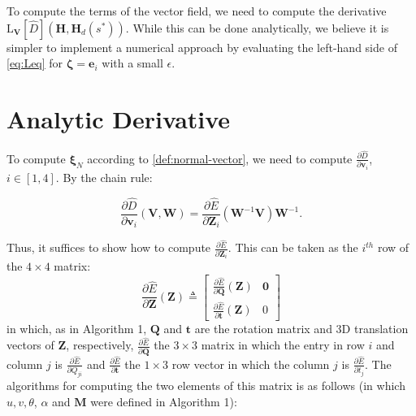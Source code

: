 To compute the terms of the vector field, we need to compute the derivative $\text{L}_{\mathbf{V}}[\widehat{D}](\mathbf{H},\mathbf{H}_d(s^*))$. While this can be done analytically, we believe it is simpler to implement a numerical approach by evaluating the left-hand side of \eqref{eq:Leq} for $\boldsymbol{\zeta} = \mathbf{e}_i$ with a small $\epsilon$.

\section{Analytic Derivative}
To compute $\boldsymbol{\xi}_N$ according to \cref{def:normal-vector}, we need to compute $\frac{\partial \widehat{D}}{\partial \mathbf{v}_i}$, $i \in [1,4]$. By the chain rule:

\begin{equation}
    \frac{\partial \widehat{D}}{\partial \mathbf{v}_i} (\mathbf{V},\mathbf{W}) =  \frac{\partial \widehat{E}}{\partial \mathbf{Z}_i}(\mathbf{W}^{-1}\mathbf{V}) \mathbf{W}^{-1}.
\end{equation}

Thus, it suffices to show how to compute $\frac{\partial \widehat{E}}{\partial \mathbf{Z}_i}$. This can be taken as the $i^{th}$ row of the $4 \times 4$ matrix:
\begin{equation}
    \frac{\partial \widehat{E}}{\partial \mathbf{Z}}(\mathbf{Z}) \triangleq \left[\begin{array}{cc} \frac{\partial \widehat{E}}{\partial \mathbf{Q}}( \mathbf{Z}) & \mathbf{0} \\
    \frac{\partial \widehat{E}}{\partial \mathbf{t}}( \mathbf{Z}) & 0 \end{array}\right]
\end{equation}
\noindent in which, as in Algorithm 1, $\mathbf{Q}$ and $\mathbf{t}$ are the rotation matrix and 3D translation vectors of $\mathbf{Z}$, respectively,  $ \frac{\partial \widehat{E}}{\partial \mathbf{Q}}$ the $3 \times 3$ matrix in which the entry in row $i$ and column $j$ is $\frac{\partial \widehat{E}}{\partial Q_{ji}}$ and $\frac{\partial \widehat{E}}{\partial \mathbf{t}}$ the $1 \times 3$ row vector in which the column $j$ is $\frac{\partial \widehat{E}}{\partial t_j}$. The algorithms for computing the two elements of this matrix is as follows (in which $u, v, \theta$, $\alpha$ and $\mathbf{M}$ were defined in Algorithm 1):

